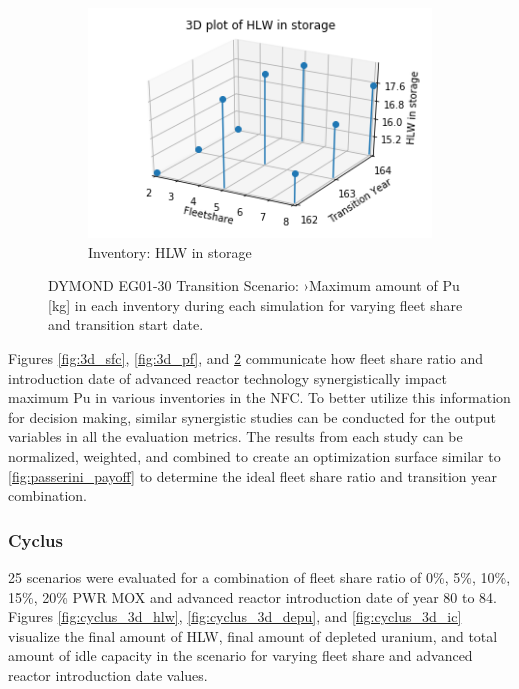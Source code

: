 \begin{figure}[H]
\begin{subfigure}[t]{0.4\textwidth}
    \end{subfigure}
    \begin{subfigure}[t]{0.4\textwidth}
        \centering
        \includegraphics[width=\linewidth]{figures/3d_hlw} 
        \caption{Inventory: HLW in storage}
        \label{fig:3d_hlw}
    \end{subfigure}
    \caption{DYMOND EG01-30 Transition Scenario: ›Maximum amount of Pu [kg] in each inventory during each simulation for varying fleet share and transition start date.}
\end{figure}

Figures \ref{fig:3d_sfc}, \ref{fig:3d_pf}, and \ref{fig:3d_hlw}
communicate how fleet share ratio and introduction date of advanced 
reactor technology 
synergistically impact maximum Pu in various inventories in the 
\gls{NFC}. 
To better utilize this information for decision making, 
similar synergistic studies can be conducted for the output 
variables in all the evaluation metrics. 
The results from each study can be normalized, weighted, and 
combined to create an optimization surface similar 
to \ref{fig:passerini_payoff} to determine the ideal fleet share 
ratio and transition year combination. 

\subsubsection{\textbf{Cyclus}}
25 scenarios were evaluated for a combination of fleet share ratio 
of 0\%, 5\%, 10\%, 15\%, 20\% PWR MOX and advanced reactor introduction 
date of year 80 to 84.
Figures \ref{fig:cyclus_3d_hlw}, \ref{fig:cyclus_3d_depu}, and 
\ref{fig:cyclus_3d_ic}
visualize the final amount of HLW, final amount of depleted uranium, and
total amount of idle capacity in the scenario for varying 
fleet share and advanced reactor introduction date values. 

